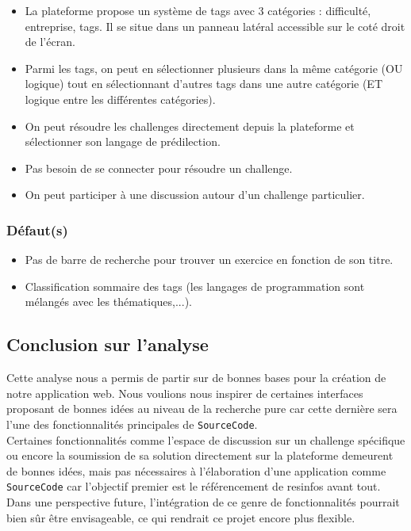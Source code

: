 \begin{itemize}
    \item La plateforme propose un système de \glspl{tag} avec 3 catégories : difficulté, entreprise, \glspl{tag}. Il se situe dans un panneau latéral accessible sur le coté droit de l'écran.
    \item Parmi les \glspl{tag}, on peut en sélectionner plusieurs dans la même catégorie (OU logique) tout en sélectionnant d'autres \glspl{tag} dans une autre catégorie (ET logique entre les différentes catégories).
    \item On peut résoudre les challenges directement depuis la plateforme et sélectionner son langage de prédilection.
    \item Pas besoin de se connecter pour résoudre un challenge.
    \item On peut participer à une discussion autour d'un challenge particulier.
\end{itemize}

\subsubsection*{Défaut(s)}

\begin{itemize}
    \item Pas de barre de recherche pour trouver un exercice en fonction de son titre.
    \item Classification sommaire des \glspl{tag} (les langages de programmation sont mélangés avec les thématiques,...).
\end{itemize}

\subsection*{Conclusion sur l'analyse}

Cette analyse nous a permis de partir sur de bonnes bases pour la création de notre application web. Nous voulions nous inspirer de certaines interfaces proposant de bonnes idées au niveau de la recherche pure car cette dernière sera l'une des fonctionnalités principales de \texttt{SourceCode}. \\

Certaines fonctionnalités comme l'espace de discussion sur un challenge spécifique ou encore la soumission de sa solution directement sur la plateforme demeurent de bonnes idées, mais pas nécessaires à l'élaboration d'une application comme \texttt{SourceCode} car l'objectif premier est le référencement de \glspl{resinfo} avant tout. Dans une perspective future, l'intégration de ce genre de fonctionnalités pourrait bien sûr être envisageable, ce qui rendrait ce projet encore plus flexible.\\

